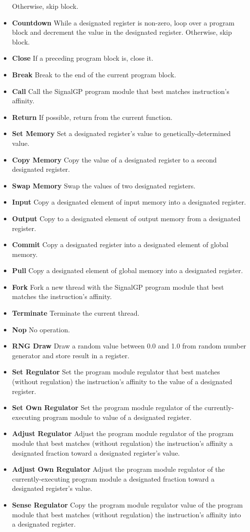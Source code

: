 \begin{itemize}
Otherwise, skip block.
\item \textbf{Countdown}
While a designated register is non-zero, loop over a program block and decrement the value in the designated register.
Otherwise, skip block.
\item \textbf{Close}
If a preceding program block is, close it.
\item \textbf{Break}
Break to the end of the current program block.
\item \textbf{Call}
Call the SignalGP program module that best matches instruction's affinity.
\item \textbf{Return}
If possible, return from the current function.
\item \textbf{Set Memory}
Set a designated register's value to genetically-determined value.
\item \textbf{Copy Memory}
Copy the value of a designated register to a second designated register.
\item \textbf{Swap Memory}
Swap the values of two designated registers.
\item \textbf{Input}
Copy a designated element of input memory into a designated register.
\item \textbf{Output}
Copy to a designated element of output memory from a designated register.
\item \textbf{Commit}
Copy a designated register into a designated element of global memory.
\item \textbf{Pull}
Copy a designated element of global memory into a designated register.
\item \textbf{Fork}
Fork a new thread with the SignalGP program module that best matches the instruction's affinity.
\item \textbf{Terminate}
Terminate the current thread.
\item \textbf{Nop}
No operation.
\item \textbf{RNG Draw}
Draw a random value between 0.0 and 1.0 from random number generator and store result in a register.
\item \textbf{Set Regulator}
Set the program module regulator that best matches (without regulation) the instruction's affinity to the value of a designated register.
\item \textbf{Set Own Regulator}
Set the program module regulator of the currently-executing program module to value of a designated register.
\item \textbf{Adjust Regulator}
Adjust the program module regulator of the program module that best matches (without regulation) the instruction's affinity a designated fraction toward a designated register's value.
\item \textbf{Adjust Own Regulator}
Adjust the program module regulator of the currently-executing program module a designated fraction toward a designated register's value.
\item \textbf{Sense Regulator}
Copy the program module regulator value of the program module that best matches (without regulation) the instruction's affinity into a designated register.
\end{itemize}


